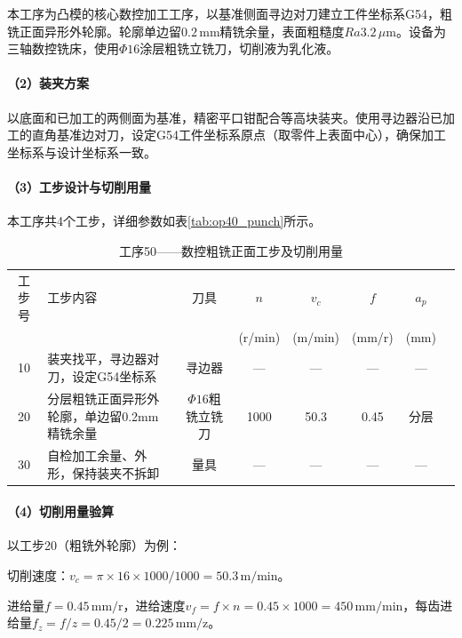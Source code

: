 \documentclass{xautCADreport}
\begin{document}
本工序为凸模的核心数控加工工序\cite{ref:wang2013,ref:li2019}，以基准侧面寻边对刀建立工件坐标系G54，粗铣正面异形外轮廓。轮廓单边留$0.2\,\mathrm{mm}$精铣余量，表面粗糙度$Ra3.2\,\mu\mathrm{m}$。设备为三轴数控铣床，使用$\Phi16$涂层粗铣立铣刀，切削液为乳化液。

\paragraph{（2）装夹方案}

以底面和已加工的两侧面为基准，精密平口钳配合等高块装夹。使用寻边器沿已加工的直角基准边对刀，设定G54工件坐标系原点（取零件上表面中心），确保加工坐标系与设计坐标系一致。

\paragraph{（3）工步设计与切削用量}

本工序共4个工步，详细参数如表\ref{tab:op40_punch}所示。

\begin{table}[H]
  \centering
  \caption{工序50——数控粗铣正面工步及切削用量}
  \label{tab:op50_punch}
  \small
  \setlength{\tabcolsep}{5pt}
  \begin{tabular}{cp{4cm}cccccc}
    \toprule
    工步号 & 工步内容 & 刀具 & \multicolumn{1}{c}{$n$} & \multicolumn{1}{c}{$v_c$} & \multicolumn{1}{c}{$f$} & \multicolumn{1}{c}{$a_p$} \\
    & & & (r/min) & (m/min) & (mm/r) & (mm) \\
    \midrule
    10 & 装夹找平，寻边器对刀，设定G54坐标系 & 寻边器 & — & — & — & — \\
    20 & 分层粗铣正面异形外轮廓，单边留0.2mm精铣余量 & $\Phi16$粗铣立铣刀 & 1000 & 50.3 & 0.45 & 分层 \\
    30 & 自检加工余量、外形，保持装夹不拆卸 & 量具 & — & — & — & — \\
    \bottomrule
  \end{tabular}
\end{table}

\paragraph{（4）切削用量验算}

以工步20（粗铣外轮廓）为例：

切削速度：$v_c = \pi \times 16 \times 1000 / 1000 = 50.3\,\mathrm{m/min}$。

进给量$f = 0.45\,\mathrm{mm/r}$，进给速度$v_f = f \times n = 0.45 \times 1000 = 450\,\mathrm{mm/min}$，每齿进给量$f_z = f / z = 0.45 / 2 = 0.225\,\mathrm{mm/z}$。
\end{document}
